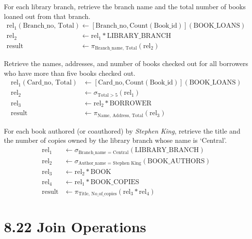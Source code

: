 \documentclass{article}
\begin{document}
\begin{parlist}
    \item For each library branch, retrieve the branch name and the total number of books loaned out from that branch.
    \begin{align*}
        \text{rel}_1(\text{Branch\_no, Total}) &\leftarrow \left[\text{Branch\_no}, \text{Count}(\text{Book\_id})\right](\text{BOOK\_LOANS}) \\ 
        \text{rel}_2 &\leftarrow \text{rel}_1 * \text{LIBRARY\_BRANCH} \\
        \text{result} &\leftarrow \pi_{\text{Branch\_name, Total}}(\text{rel}_2)
    \end{align*}
    
    \item Retrieve the names, addresses, and number of books checked out for all borrowers who have more than five books checked out.
    \begin{align*}
        \text{rel}_1(\text{Card\_no, Total}) &\leftarrow \left[\text{Card\_no}, \text{Count}(\text{Book\_id})\right](\text{BOOK\_LOANS}) \\
        \text{rel}_2 &\leftarrow \sigma_{\text{Total} > 5}(\text{rel}_1) \\
        \text{rel}_3 &\leftarrow \text{rel}_2 * \text{BORROWER} \\
        \text{result} &\leftarrow \pi_{\text{Name, Address, Total}}(\text{rel}_3)
    \end{align*}
    
    \item For each book authored (or coauthored) by \textit{Stephen King}, retrieve the title and the number of copies owned by the library branch whose name is `Central'.
    \begin{align*}
        \text{rel}_1 &\leftarrow \sigma_{\text{Branch\_name = Central}}(\text{LIBRARY\_BRANCH}) \\
        \text{rel}_2 &\leftarrow \sigma_{\text{Author\_name = Stephen King}}(\text{BOOK\_AUTHORS}) \\
        \text{rel}_3 &\leftarrow \text{rel}_2 * \text{BOOK} \\
        \text{rel}_4 &\leftarrow \text{rel}_1 * \text{BOOK\_COPIES} \\
        \text{result} &\leftarrow \pi_{\text{Title, No\_of\_copies}}(\text{rel}_3 * \text{rel}_4)
    \end{align*}

\end{parlist}

\newpage
\section*{8.22 Join Operations}
\end{document}
